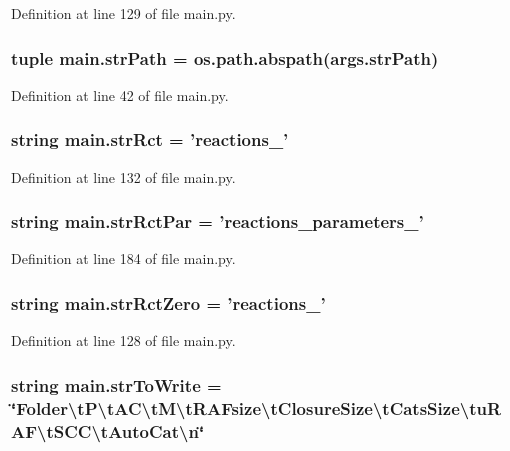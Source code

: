 Definition at line 129 of file main.\+py.

\hypertarget{a00153_ac0b5b603b5f89c10838ce6a42be8c6f7}{
\subsubsection[{str\+Path}]{\setlength{\rightskip}{0pt plus 5cm}tuple main.\+str\+Path = os.\+path.\+abspath(args.\+str\+Path)}}\label{a00153_ac0b5b603b5f89c10838ce6a42be8c6f7}


Definition at line 42 of file main.\+py.

\hypertarget{a00153_a28a37e653a4c0984df32f8d83c3596ff}{
\subsubsection[{str\+Rct}]{\setlength{\rightskip}{0pt plus 5cm}string main.\+str\+Rct = 'reactions\+\_\+'}}\label{a00153_a28a37e653a4c0984df32f8d83c3596ff}


Definition at line 132 of file main.\+py.

\hypertarget{a00153_af48af84bff2351a55727aba6a63c1b52}{
\subsubsection[{str\+Rct\+Par}]{\setlength{\rightskip}{0pt plus 5cm}string main.\+str\+Rct\+Par = 'reactions\+\_\+parameters\+\_\+'}}\label{a00153_af48af84bff2351a55727aba6a63c1b52}


Definition at line 184 of file main.\+py.

\hypertarget{a00153_adbfa32333003aa707723362b43bc11ff}{
\subsubsection[{str\+Rct\+Zero}]{\setlength{\rightskip}{0pt plus 5cm}string main.\+str\+Rct\+Zero = 'reactions\+\_\+'}}\label{a00153_adbfa32333003aa707723362b43bc11ff}


Definition at line 128 of file main.\+py.

\hypertarget{a00153_ab9980383a541b03ce91d6b812a4bf79a}{
\subsubsection[{str\+To\+Write}]{\setlength{\rightskip}{0pt plus 5cm}string main.\+str\+To\+Write = \char`\"{}Folder\textbackslash{}t\+P\textbackslash{}t\+A\+C\textbackslash{}t\+M\textbackslash{}t\+R\+A\+Fsize\textbackslash{}t\+Closure\+Size\textbackslash{}t\+Cats\+Size\textbackslash{}tu\+R\+A\+F\textbackslash{}t\+S\+C\+C\textbackslash{}t\+Auto\+Cat\textbackslash{}n\char`\"{}}}\label{a00153_ab9980383a541b03ce91d6b812a4bf79a}


